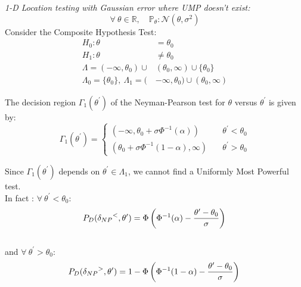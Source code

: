 \documentclass[12pt]{report}
\begin{document}
\begin{exmp}
\emph{1-D Location testing with Gaussian error where UMP doesn't exist:}\\
\[\forall\ \theta \in \mathbb{R}, \quad \mathbb{P}_\theta : \mathcal{N}(\theta, \sigma^2)\]
\noindent Consider the Composite Hypothesis Test:
\begin{align*}
H_0:\theta &= \theta_0 \\
H_1:\theta &\neq \theta_0 \\
\Lambda = (-\infty,\theta_0)\cup&(\theta_0,\infty)\cup\{\theta_0\}\\
\Lambda_0 = \{\theta_0\} , \ \Lambda_1 = (&-\infty, \theta_0) \cup (\theta_0, \infty)
\end{align*}



\noindent The decision region $\Gamma_1(\theta^\prime)$ of the Neyman-Pearson test for $\theta$ versus $\theta^\prime$ is given by:
\begin{equation}
    \Gamma_1(\theta^\prime)=
    \begin{cases}
    (-\infty, \theta_0 + \sigma\Phi^{-1}(\alpha)) &\quad\theta^\prime < \theta_0\\
    (\theta_0 + \sigma\Phi^{-1}(1-\alpha), \infty) &\quad\theta^\prime > \theta_0
    \end{cases}
\end{equation}


\noindent Since $\Gamma_1(\theta^\prime)$ depends on $\theta^\prime\in\Lambda_1$, we cannot find a Uniformly Most Powerful test.\\
In fact : $\forall\ \theta^\prime < \theta_0$:
\begin{equation}
P_D({\delta_{NP}}^{<},\theta^\prime)=\Phi\left(\Phi^{-1}(\alpha)-\frac{\theta^\prime-\theta_0}{\sigma}\right) \label{pdless} \\
\end{equation}
\\and $\forall\ \theta^\prime>\theta_0$: \\
\begin{equation}
P_D({\delta_{NP}}^{>},\theta^\prime)=1-\Phi\left(\Phi^{-1}(1-\alpha)-\frac{\theta^\prime-\theta_0}{\sigma}\right) \label{pdgrt}\\
\end{equation}


\end{exmp}
\end{document}
